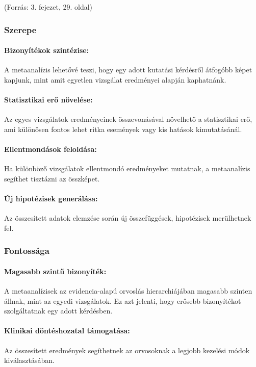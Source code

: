 \documentclass[a4paper,12pt]{article}
\begin{document}
    (Forrás: 3. fejezet, 29. oldal)

    \subsubsection{Szerepe}

    \paragraph{Bizonyítékok szintézise:}
    A metaanalízis lehetővé teszi, hogy egy adott kutatási kérdésről átfogóbb képet kapjunk, mint amit egyetlen vizsgálat eredményei alapján kaphatnánk.

    \paragraph{Statisztikai erő növelése:}
    Az egyes vizsgálatok eredményeinek összevonásával növelhető a statisztikai erő, ami különösen fontos lehet ritka események vagy kis hatások kimutatásánál.

    \paragraph{Ellentmondások feloldása:}
    Ha különböző vizsgálatok ellentmondó eredményeket mutatnak, a metaanalízis segíthet tisztázni az összképet.

    \paragraph{Új hipotézisek generálása:}
    Az összesített adatok elemzése során új összefüggések, hipotézisek merülhetnek fel.

    \subsubsection{Fontossága}

    \paragraph{Magasabb szintű bizonyíték:}
    A metaanalízisek az evidencia-alapú orvoslás hierarchiájában magasabb szinten állnak, mint az egyedi vizsgálatok. Ez azt jelenti, hogy erősebb bizonyítékot szolgáltatnak egy adott kérdésben.

    \paragraph{Klinikai döntéshozatal támogatása:}
    Az összesített eredmények segíthetnek az orvosoknak a legjobb kezelési módok kiválasztásában.
\end{document}

